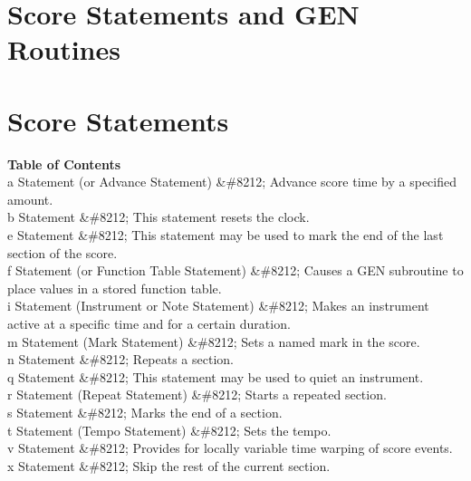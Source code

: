 \begin{comment}
\documentclass[10pt]{article}
\usepackage{fullpage, graphicx, url}
\setlength{\parskip}{1ex}
\setlength{\parindent}{0ex}
\title{Score Statements and GEN Routines}



\begin{tabular}{ccc}
The Alternative Csound Reference Manual & & \\
Previous & &Next

\end{tabular}

\end{comment}
\section{Score Statements and GEN Routines}
\section{Score Statements}
\begin{description}
\item[\textbf{Table of Contents}
]\item[a Statement (or Advance Statement) \&\#8212; Advance score time by a specified amount. ]\item[b Statement \&\#8212; This statement resets the clock. ]\item[e Statement \&\#8212; This statement may be used to mark the end of the last section of the score. ]\item[f Statement (or Function Table Statement) \&\#8212; Causes a GEN subroutine to place values in a stored function table. ]\item[i Statement (Instrument or Note Statement) \&\#8212; Makes an instrument active at a specific time and for a certain duration. ]\item[m Statement (Mark Statement) \&\#8212; Sets a named mark in the score. ]\item[n Statement \&\#8212; Repeats a section. ]\item[q Statement \&\#8212; This statement may be used to quiet an instrument. ]\item[r Statement (Repeat Statement) \&\#8212; Starts a repeated section. ]\item[s Statement \&\#8212; Marks the end of a section. ]\item[t Statement (Tempo Statement) \&\#8212; Sets the tempo. ]\item[v Statement \&\#8212; Provides for locally variable time warping of score events. ]\item[x Statement \&\#8212; Skip the rest of the current section. ]
\end{description}


\begin{comment}
\begin{tabular}{lcr}
Previous &Home &Next \\
zkwm &Up &a Statement (or Advance Statement)

\end{tabular}



\end{comment}
